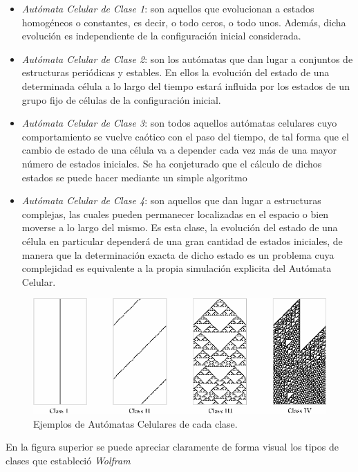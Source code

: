 \begin{itemize}
\item \textit{Autómata Celular de Clase 1}: son aquellos que evolucionan a estados homogéneos o constantes, es decir, o todo ceros, o todo unos. Además, dicha evolución es independiente de la configuración inicial considerada.
\item \textit{Autómata Celular de Clase 2}: son los autómatas que dan lugar a conjuntos de estructuras periódicas y estables. En ellos la evolución del estado de una determinada célula a lo largo del tiempo estará influida por los estados de un grupo fijo de células de la configuración inicial.
\item \textit{Autómata Celular de Clase 3}: son todos aquellos autómatas celulares cuyo comportamiento se vuelve caótico con el paso del tiempo, de tal forma que el cambio de estado de una célula va a depender cada vez más de una mayor número de estados iniciales. Se ha conjeturado que el cálculo de dichos estados se puede hacer mediante un simple algoritmo
\item \textit{Autómata Celular de Clase 4}: son aquellos que dan lugar a estructuras complejas, las cuales pueden permanecer localizadas en el espacio o bien moverse a lo largo del mismo. Es esta clase, la evolución del estado de una célula en particular dependerá de una gran cantidad de estados iniciales, de manera que la determinación exacta de dicho estado es un problema cuya complejidad es equivalente a la propia simulación explicita del Autómata Celular.
\end{itemize}

\begin{figure}[H]
\centering
\includegraphics[scale=0.7]{imagenes/AutomatasCelulares_WolframClasses.png}
\caption{Ejemplos de Autómatas Celulares de cada clase.}
\label{fig:clase}
\end{figure}

En la figura superior se puede apreciar claramente de forma visual los tipos de clases que estableció \textit{Wolfram}


